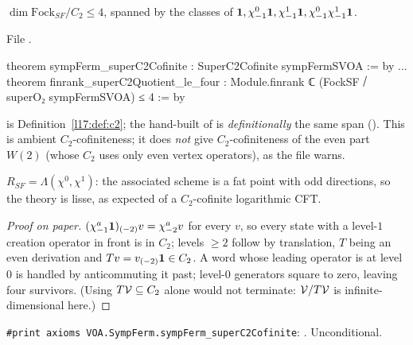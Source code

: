\begin{theorem}\label{l17:thm:sfc2}
$\dim\mathrm{Fock}_{SF}/C_2\le4$, spanned by the classes of $\mathbf{1},\chi^0_{-1}\mathbf{1},
\chi^1_{-1}\mathbf{1},\chi^0_{-1}\chi^1_{-1}\mathbf{1}$.
\end{theorem}
\noindent File .
\begin{leancode}
theorem sympFerm_superC2Cofinite : SuperC2Cofinite sympFermSVOA := by
...
theorem finrank_superC2Quotient_le_four :
    Module.finrank ℂ (FockSF ⧸ superO₂ sympFermSVOA) ≤ 4 := by
\end{leancode}
\begin{dictionary}
 is Definition~\ref{l17:def:c2}; the hand-built  of
 is \emph{definitionally} the same span ().
This is ambient $C_2$-cofiniteness; it does \emph{not} give $C_2$-cofiniteness of the even part
$W(2)$ (whose $C_2$ uses only even vertex operators), as the file warns.
\end{dictionary}
\begin{physics}
$R_{SF}=\Lambda(\chi^0,\chi^1)$: the associated scheme is a fat point with odd directions, so the
theory is lisse, as expected of a $C_2$-cofinite logarithmic CFT.
\end{physics}
\begin{proof}[Proof on paper]
$(\chi^a_{-1}\mathbf{1})_{(-2)}v=\chi^a_{-2}v$ for every $v$, so every state with a level-$1$ creation
operator in front is in $C_2$; levels $\ge2$ follow by translation, $T$ being an even derivation and
$Tv=v_{(-2)}\mathbf{1}\in C_2$. A word whose leading operator is at level $0$ is handled by
anticommuting it past; level-$0$ generators square to zero, leaving four survivors. (Using
$T\mathcal{V}\subseteq C_2$ alone would not terminate: $\mathcal{V}/T\mathcal{V}$ is
infinite-dimensional here.)
\end{proof}
\begin{status}
\texttt{\#print axioms VOA.SympFerm.sympFerm\_superC2Cofinite}: . Unconditional.
\end{status}

